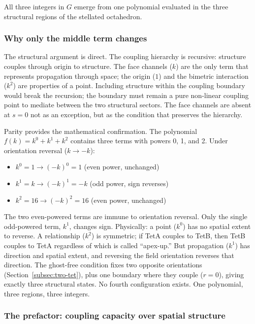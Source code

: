 \documentclass[aps,prd,preprint,superscriptaddress,showpacs,preprintnumbers,amsmath,amssymb,nofootinbib]{revtex4-2}
\begin{document}
All three integers in $G$ emerge from one polynomial evaluated in the three structural regions of the stellated octahedron.

\subsubsection*{Why only the middle term changes}

The structural argument is direct. The coupling hierarchy is recursive: structure couples through origin to structure. The face channels ($k$) are the only term that represents propagation through space; the origin ($1$) and the bimetric interaction ($k^2$) are properties of a point. Including structure within the coupling boundary would break the recursion; the boundary must remain a pure non-linear coupling point to mediate between the two structural sectors. The face channels are absent at $s = 0$ not as an exception, but as the condition that preserves the hierarchy.

Parity provides the mathematical confirmation. The polynomial $f(k) = k^0 + k^1 + k^2$ contains three terms with powers 0, 1, and 2. Under orientation reversal ($k \to -k$):
\begin{itemize}
\item $k^0 = 1 \to (-k)^0 = 1$ \quad (even power, unchanged)
\item $k^1 = k \to (-k)^1 = -k$ \quad (odd power, sign reverses)
\item $k^2 = 16 \to (-k)^2 = 16$ \quad (even power, unchanged)
\end{itemize}

The two even-powered terms are immune to orientation reversal. Only the single odd-powered term, $k^1$, changes sign. Physically: a point ($k^0$) has no spatial extent to reverse. A relationship ($k^2$) is symmetric; if TetA couples to TetB, then TetB couples to TetA regardless of which is called ``apex-up.'' But propagation ($k^1$) has direction and spatial extent, and reversing the field orientation reverses that direction. The ghost-free condition fixes two opposite orientations (Section~\ref{subsec:two-tet}), plus one boundary where they couple ($r = 0$), giving exactly three structural states. No fourth configuration exists. One polynomial, three regions, three integers.

\subsubsection*{The prefactor: coupling capacity over spatial structure}
\end{document}
